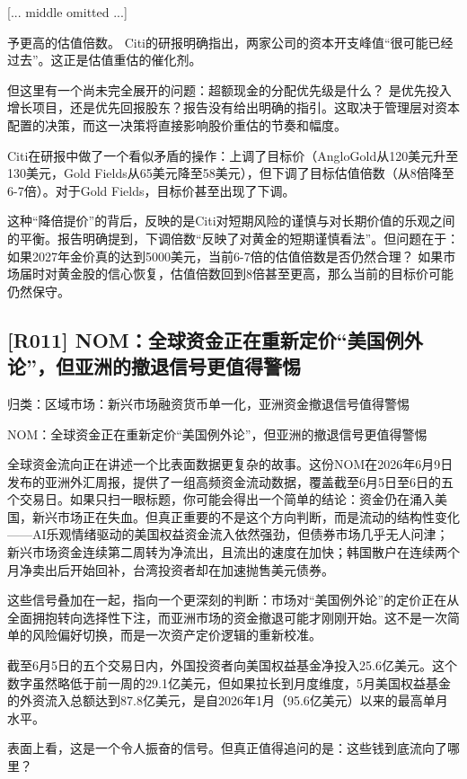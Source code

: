 \documentclass[11pt]{ctexart}
\begin{document}
[... middle omitted ...]

予更高的估值倍数。 Citi的研报明确指出，两家公司的资本开支峰值“很可能已经过去”。这正是估值重估的催化剂。

但这里有一个尚未完全展开的问题：超额现金的分配优先级是什么？ 是优先投入增长项目，还是优先回报股东？报告没有给出明确的指引。这取决于管理层对资本配置的决策，而这一决策将直接影响股价重估的节奏和幅度。

Citi在研报中做了一个看似矛盾的操作：上调了目标价（AngloGold从120美元升至130美元，Gold Fields从65美元降至58美元），但下调了目标估值倍数（从8倍降至6-7倍）。对于Gold Fields，目标价甚至出现了下调。

这种“降倍提价”的背后，反映的是Citi对短期风险的谨慎与对长期价值的乐观之间的平衡。报告明确提到，下调倍数“反映了对黄金的短期谨慎看法”。但问题在于：如果2027年金价真的达到5000美元，当前6-7倍的估值倍数是否仍然合理？ 如果市场届时对黄金股的信心恢复，估值倍数回到8倍甚至更高，那么当前的目标价可能仍然保守。

\subsection{[R011] NOM：全球资金正在重新定价“美国例外论”，但亚洲的撤退信号更值得警惕}
{\small\color{refgray}归类：区域市场：新兴市场融资货币单一化，亚洲资金撤退信号值得警惕}

NOM：全球资金正在重新定价“美国例外论”，但亚洲的撤退信号更值得警惕

全球资金流向正在讲述一个比表面数据更复杂的故事。这份NOM在2026年6月9日发布的亚洲外汇周报，提供了一组高频资金流动数据，覆盖截至6月5日至6日的五个交易日。如果只扫一眼标题，你可能会得出一个简单的结论：资金仍在涌入美国，新兴市场正在失血。但真正重要的不是这个方向判断，而是流动的结构性变化——AI乐观情绪驱动的美国权益资金流入依然强劲，但债券市场几乎无人问津；新兴市场资金连续第二周转为净流出，且流出的速度在加快；韩国散户在连续两个月净卖出后开始回补，台湾投资者却在加速抛售美元债券。

这些信号叠加在一起，指向一个更深刻的判断：市场对“美国例外论”的定价正在从全面拥抱转向选择性下注，而亚洲市场的资金撤退可能才刚刚开始。这不是一次简单的风险偏好切换，而是一次资产定价逻辑的重新校准。

截至6月5日的五个交易日内，外国投资者向美国权益基金净投入25.6亿美元。这个数字虽然略低于前一周的29.1亿美元，但如果拉长到月度维度，5月美国权益基金的外资流入总额达到87.8亿美元，是自2026年1月（95.6亿美元）以来的最高单月水平。

表面上看，这是一个令人振奋的信号。但真正值得追问的是：这些钱到底流向了哪里？
\end{document}
